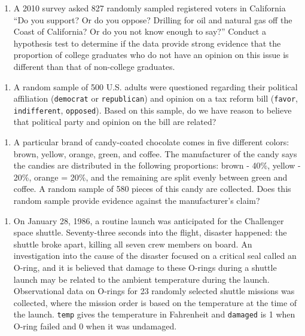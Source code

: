 \documentclass[]{article}
\providecommand{\tightlist}{%
  \setlength{\itemsep}{0pt}\setlength{\parskip}{0pt}}
\begin{document}
\begin{enumerate}
\def\labelenumi{\arabic{enumi}.}
\setcounter{enumi}{4}
\tightlist
\item
  A 2010 survey asked 827 randomly sampled registered voters in
  California ``Do you support? Or do you oppose? Drilling for oil and
  natural gas off the Coast of California? Or do you not know enough to
  say?'' Conduct a hypothesis test to determine if the data provide
  strong evidence that the proportion of college graduates who do not
  have an opinion on this issue is different than that of non-college
  graduates.
\end{enumerate}

\begin{enumerate}
\def\labelenumi{\arabic{enumi}.}
\setcounter{enumi}{5}
\tightlist
\item
  A random sample of 500 U.S. adults were questioned regarding their
  political affiliation (\texttt{democrat} or \texttt{republican}) and
  opinion on a tax reform bill (\texttt{favor}, \texttt{indifferent},
  \texttt{opposed}). Based on this sample, do we have reason to believe
  that political party and opinion on the bill are related?
\end{enumerate}

\begin{enumerate}
\def\labelenumi{\arabic{enumi}.}
\setcounter{enumi}{6}
\tightlist
\item
  A particular brand of candy-coated chocolate comes in five different
  colors: brown, yellow, orange, green, and coffee. The manufacturer of
  the candy says the candies are distributed in the following
  proportions: brown - 40\%, yellow - 20\%, orange = 20\%, and the
  remaining are split evenly between green and coffee. A random sample
  of 580 pieces of this candy are collected. Does this random sample
  provide evidence against the manufacturer's claim?
\end{enumerate}

\begin{enumerate}
\def\labelenumi{\arabic{enumi}.}
\setcounter{enumi}{7}
\tightlist
\item
  On January 28, 1986, a routine launch was anticipated for the
  Challenger space shuttle. Seventy-three seconds into the flight,
  disaster happened: the shuttle broke apart, killing all seven crew
  members on board. An investigation into the cause of the disaster
  focused on a critical seal called an O-ring, and it is believed that
  damage to these O-rings during a shuttle launch may be related to the
  ambient temperature during the launch. Observational data on O-rings
  for 23 randomly selected shuttle missions was collected, where the
  mission order is based on the temperature at the time of the launch.
  \texttt{temp} gives the temperature in Fahrenheit and \texttt{damaged}
  is 1 when O-ring failed and 0 when it was undamaged.
\end{enumerate}
\end{document}
